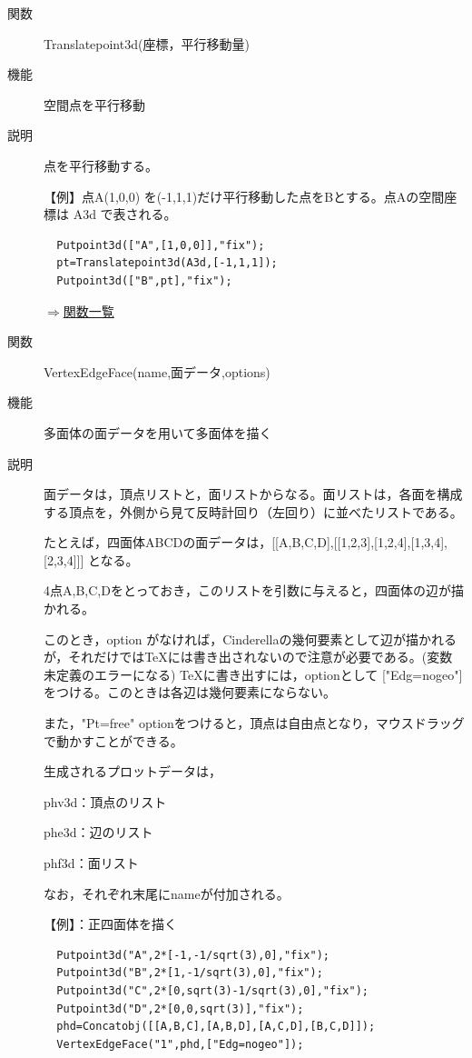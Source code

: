 \documentclass[papersize,a4paper,12pt,uplatex]{jsarticle}
\begin{document}
\begin{description}
\hypertarget{translatepoint3d}{}
\item[関数]  Translatepoint3d(座標，平行移動量)
\item[機能]  空間点を平行移動
\item[説明]  点を平行移動する。

\vspace{\baselineskip}
【例】点A(1,0,0) を(-1,1,1)だけ平行移動した点をBとする。点Aの空間座標は A3d で表される。 
\begin{verbatim}
  Putpoint3d(["A",[1,0,0]],"fix");
  pt=Translatepoint3d(A3d,[-1,1,1]);
  Putpoint3d(["B",pt],"fix");
\end{verbatim}
\vspace{\baselineskip}
\begin{flushright} \hyperlink{functionlist}{$\Rightarrow$関数一覧}\end{flushright}

\hypertarget{vertexedgeface}{}
\item[関数]  VertexEdgeFace(name,面データ,options)
\item[機能]  多面体の面データを用いて多面体を描く
\item[説明]  面データは，頂点リストと，面リストからなる。面リストは，各面を構成する頂点を，外側から見て反時計回り（左回り）に並べたリストである。

たとえば，四面体ABCDの面データは，[[A,B,C,D],[[1,2,3],[1,2,4],[1,3,4],[2,3,4]]] となる。

4点A,B,C,Dをとっておき，このリストを引数に与えると，四面体の辺が描かれる。

このとき，option がなければ，Cinderellaの幾何要素として辺が描かれるが，それだけではTeXには書き出されないので注意が必要である。(変数未定義のエラーになる)  TeXに書き出すには，optionとして ["Edg=nogeo"] をつける。このときは各辺は幾何要素にならない。

また，"Pt=free" optionをつけると，頂点は自由点となり，マウスドラッグで動かすことができる。

生成されるプロットデータは，

phv3d：頂点のリスト

phe3d：辺のリスト

phf3d：面リスト

なお，それぞれ末尾にnameが付加される。

\vspace{\baselineskip}
【例】：正四面体を描く
\begin{verbatim}
  Putpoint3d("A",2*[-1,-1/sqrt(3),0],"fix");
  Putpoint3d("B",2*[1,-1/sqrt(3),0],"fix");
  Putpoint3d("C",2*[0,sqrt(3)-1/sqrt(3),0],"fix");
  Putpoint3d("D",2*[0,0,sqrt(3)],"fix");
  phd=Concatobj([[A,B,C],[A,B,D],[A,C,D],[B,C,D]]);
  VertexEdgeFace("1",phd,["Edg=nogeo"]);
\end{verbatim}
        \begin{center}  \end{center}


\end{description}
\end{document}

